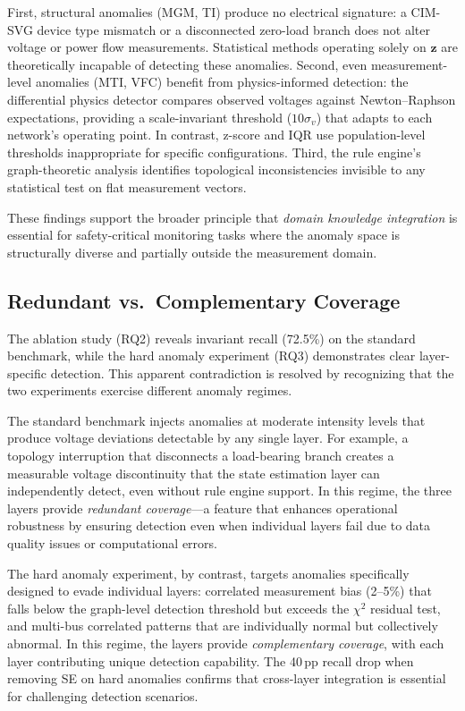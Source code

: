 \documentclass[research]{fcs}
\begin{document}
First, structural anomalies (MGM, TI) produce no electrical signature: a CIM-SVG device type mismatch or a disconnected zero-load branch does not alter voltage or power flow measurements. Statistical methods operating solely on $\mathbf{z}$ are theoretically incapable of detecting these anomalies. Second, even measurement-level anomalies (MTI, VFC) benefit from physics-informed detection: the differential physics detector compares observed voltages against Newton--Raphson expectations, providing a scale-invariant threshold ($10\sigma_v$) that adapts to each network's operating point. In contrast, z-score and IQR use population-level thresholds inappropriate for specific configurations. Third, the rule engine's graph-theoretic analysis identifies topological inconsistencies invisible to any statistical test on flat measurement vectors.

These findings support the broader principle that \emph{domain knowledge integration} is essential for safety-critical monitoring tasks where the anomaly space is structurally diverse and partially outside the measurement domain.

\subsection{Redundant vs.\ Complementary Coverage}

The ablation study (RQ2) reveals invariant recall (72.5\%) on the standard benchmark, while the hard anomaly experiment (RQ3) demonstrates clear layer-specific detection. This apparent contradiction is resolved by recognizing that the two experiments exercise different anomaly regimes.

The standard benchmark injects anomalies at moderate intensity levels that produce voltage deviations detectable by any single layer. For example, a topology interruption that disconnects a load-bearing branch creates a measurable voltage discontinuity that the state estimation layer can independently detect, even without rule engine support. In this regime, the three layers provide \emph{redundant coverage}---a feature that enhances operational robustness by ensuring detection even when individual layers fail due to data quality issues or computational errors.

The hard anomaly experiment, by contrast, targets anomalies specifically designed to evade individual layers: correlated measurement bias (2--5\%) that falls below the graph-level detection threshold but exceeds the $\chi^2$ residual test, and multi-bus correlated patterns that are individually normal but collectively abnormal. In this regime, the layers provide \emph{complementary coverage}, with each layer contributing unique detection capability. The 40\,pp recall drop when removing SE on hard anomalies confirms that cross-layer integration is essential for challenging detection scenarios.
\end{document}
